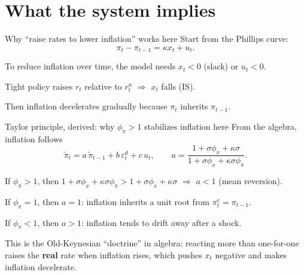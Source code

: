 \documentclass[aspectratio=169,xcolor=dvipsnames]{beamer}
\let\tempone\itemize
\let\temptwo\enditemize
\renewenvironment{itemize}{\tempone\addtolength{\itemsep}{\fill}}{\temptwo}
\begin{document}
\section[Implication]{What the system implies}

\begin{frame}{Why ``raise rates to lower inflation'' works here}
\small
Start from the Phillips curve:
\[
\pi_t-\pi_{t-1} = \kappa x_t + u_t.
\]

\begin{itemize}
\item To reduce inflation over time, the model needs $x_t<0$ (slack) or $u_t<0$.
\item Tight policy raises $r_t$ relative to $r_t^n$ \;$\Rightarrow$\; $x_t$ falls (IS).
\item Then inflation decelerates gradually because $\pi_t$ inherits $\pi_{t-1}$.
\end{itemize}
\end{frame}


\begin{frame}{Taylor principle, derived: why $\phi_{\pi}>1$ stabilizes inflation here}
\small
From the algebra, inflation follows
\[
\tilde\pi_t = a\,\tilde\pi_{t-1} + b\,\varepsilon_t^{d} + c\,u_t,
\qquad
a=\frac{1+\sigma\phi_x+\kappa\sigma}{1+\sigma\phi_x+\kappa\sigma\phi_{\pi}}.
\]

\begin{itemize}
\item If $\phi_{\pi}>1$, then $1+\sigma\phi_x+\kappa\sigma\phi_{\pi} > 1+\sigma\phi_x+\kappa\sigma$
\;\;$\Rightarrow$\;\; $a<1$ (mean reversion).
\item If $\phi_{\pi}=1$, then $a=1$: inflation inherits a unit root from $\pi_t^{e}=\pi_{t-1}$.
\item If $\phi_{\pi}<1$, then $a>1$: inflation tends to drift away after a shock.
\end{itemize}

\vspace{0.3em}
\small
This is the Old-Keynesian ``doctrine'' in algebra: reacting more than one-for-one raises the \textbf{real} rate when inflation rises, which pushes $x_t$ negative and makes inflation decelerate.
\end{frame}
\end{document}
